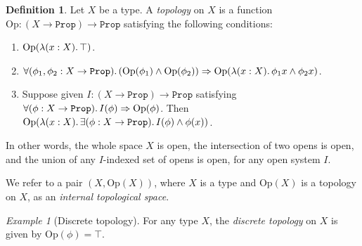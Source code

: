 \documentclass[11pt, oneside, article]{memoir}
\theoremstyle{plain}
\theoremstyle{definition}
\newtheorem{definition}[theorem]{Definition}
\theoremstyle{remark}
\newtheorem{example}[theorem]{Example}
\newcommand{\const}[1]{\mathtt{#1}}
\newcommand{\Set}[1]{\mathrm{#1}}
\newcommand{\Prop}{\const{Prop}}
\newcommand{\Op}{\Set{Op}}
\newcommand{\imp}{\Rightarrow}
\begin{document}
\begin{definition}
Let $X$ be a type. A \emph{topology} on $X$ is a function $\Op:(X\to\Prop)\to\Prop$ satisfying the following conditions:
\begin{enumerate}
	\item $\Op(\lambda(x:X)\ldotp\top)$.
	\item $\forall(\phi_1,\phi_2:X\to\Prop)\ldotp(\Op(\phi_1)\wedge\Op(\phi_2))\imp\Op(\lambda(x:X)\ldotp\phi_1 x\wedge\phi_2 x)$.
	\item Suppose given $I:(X\to\Prop)\to\Prop$ satisfying $\forall(\phi:X\to\Prop)\ldotp I(\phi)\imp\Op(\phi)$. Then $\Op(\lambda(x:X)\ldotp\exists(\phi:X\to\Prop)\ldotp I(\phi)\wedge\phi (x))$.
\end{enumerate}
In other words, the whole space $X$ is open, the intersection of two opens is open, and the union of any $I$-indexed set of opens is open, for any open system $I$. %

We refer to a pair $(X,\Op(X))$, where $X$ is a type and $\Op(X)$ is a topology on $X$, as an \emph{internal topological space}.
\end{definition}

\begin{example}[Discrete topology]
For any type $X$, the \emph{discrete topology} on $X$ is given by $\Op(\phi)=\top$.
\end{example}
\end{document}
